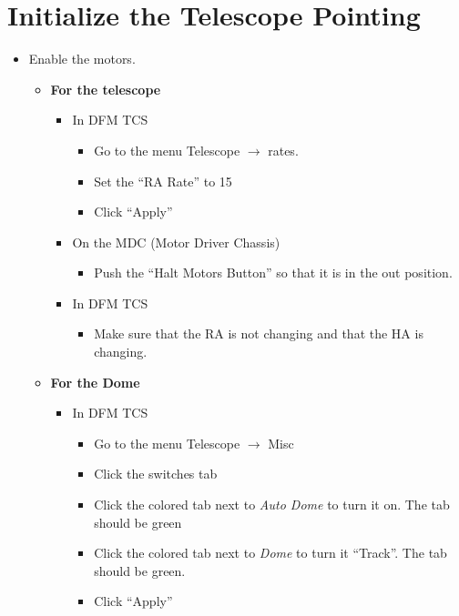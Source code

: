 \documentclass[letterpaper, 12pt]{report}
\begin{document}
\section{Initialize the Telescope Pointing}
\begin{itemize}
	\item Enable the motors.
		\begin{itemize}
			\item \textbf{For the telescope}
			\begin{itemize}
				\item In DFM TCS
				\begin{itemize}
					\item Go to the menu Telescope $\rightarrow$ rates.
					\item Set the ``RA Rate'' to 15
					\item Click ``Apply''
				\end{itemize}
				\item On the MDC (Motor Driver Chassis)
				\begin{itemize}
					\item Push the ``Halt Motors Button'' so that it is in the out position.
				\end{itemize}
				\end{itemize}
				\begin{itemize}
					\item In DFM TCS
					\begin{itemize}
						\item Make sure that the RA is not changing and that the HA is changing.
					\end{itemize}
				\end{itemize}
				\end{itemize}
				\begin{itemize}
					\item \textbf{For the Dome}
					\begin{itemize}
						\item In DFM TCS
						\begin{itemize}
							\item Go to the menu Telescope $\rightarrow$ Misc
							\item Click the switches tab
							\item Click the colored tab next to \emph{Auto Dome} to turn it on. The tab should be green
							\item Click the colored tab next to \emph{Dome} to turn it ``Track''. The tab should be green.
							\item Click ``Apply''

\end{itemize}
\end{itemize}
\end{itemize}
\end{itemize}
\end{document}
